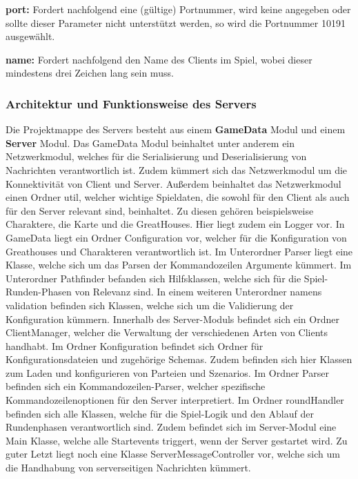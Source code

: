 \documentclass[12pt]{article}
\newcounter{fa}
\begin{document}
\textbf{port:} Fordert nachfolgend eine (gültige) Portnummer, wird keine angegeben oder sollte dieser Parameter
nicht unterstützt werden, so wird die Portnummer 10191 ausgewählt.

\textbf{name:} Fordert nachfolgend den Name des Clients im Spiel, wobei dieser mindestens drei Zeichen lang
sein muss.

\subsubsection{Architektur und Funktionsweise des Servers}
Die Projektmappe des Servers besteht aus einem \textbf{GameData} Modul und einem \textbf{Server} Modul. Das GameData Modul beinhaltet unter anderem ein Netzwerkmodul, welches für die Serialisierung und Deserialisierung von Nachrichten verantwortlich ist. Zudem kümmert sich das Netzwerkmodul um die Konnektivität von Client und Server. Außerdem beinhaltet das Netzwerkmodul einen Ordner util, welcher wichtige Spieldaten, die sowohl für den Client als auch für den Server relevant sind, beinhaltet. Zu diesen gehören beispielsweise Charaktere, die Karte und die GreatHouses. Hier liegt zudem ein Logger vor. In GameData liegt ein Ordner Configuration vor, welcher für die Konfiguration von Greathouses und Charakteren verantwortlich ist. Im Unterordner Parser liegt eine Klasse, welche sich um das Parsen der Kommandozeilen Argumente kümmert. Im Unterordner Pathfinder befanden sich Hilfsklassen, welche sich für die Spiel-Runden-Phasen von Relevanz sind. In einem weiteren Unterordner namens validation befinden sich Klassen, welche sich um die Validierung der Konfiguration kümmern. Innerhalb des Server-Moduls befindet sich ein Ordner ClientManager, welcher die Verwaltung der verschiedenen Arten von Clients handhabt. Im Ordner Konfiguration befindet sich Ordner für Konfigurationsdateien und zugehörige Schemas. Zudem befinden sich hier Klassen zum Laden und konfigurieren von Parteien und Szenarios. Im Ordner Parser befinden sich ein Kommandozeilen-Parser, welcher spezifische Kommandozeilenoptionen für den Server interpretiert. Im Ordner roundHandler befinden sich alle Klassen, welche für die Spiel-Logik und den Ablauf der Rundenphasen verantwortlich sind. Zudem befindet sich im Server-Modul eine Main Klasse, welche alle Startevents triggert, wenn der Server gestartet wird. Zu guter Letzt liegt noch eine Klasse ServerMessageController vor, welche sich um die Handhabung von serverseitigen Nachrichten kümmert.
\end{document}
